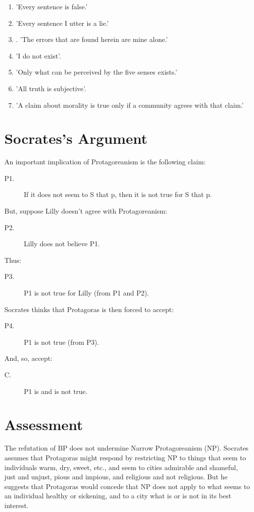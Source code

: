 \documentclass[oneside]{article}
\begin{document}
\begin{enumerate}
\item  'Every sentence is false.' 
\item 'Every sentence I utter is a lie.'
\item. 'The errors that are found herein are mine alone.'
\item 'I do not exist'.
\item 'Only what can be perceived by the five senses exists.'
\item 'All truth is subjective'.
\item 'A claim about morality is true only if a community agrees with that claim.'
\end{enumerate}

\section*{Socrates's Argument}

An important implication of Protagoreanism is the following claim:
\begin{description}
\item[P1.] If it does not seem to S that p, then it is not true for S that p. \end{description}

But, suppose Lilly doesn't agree with Protagoreanism:

\begin{description}
\item[P2.] Lilly does not believe P1. \end{description}
Thus:
\begin{description}
\item[P3.] P1 is not true for Lilly (from P1 and P2).
\end{description}
Socrates thinks that Protagoras is then forced to accept: 
\begin{description}
\item[P4.] P1 is not true (from P3).
\end{description}
And, so, accept: 
\begin{description}
\item[C.] P1 is and is not true. 
\end{description}


\section*{Assessment}

The refutation of BP does not undermine Narrow Protagoreanism (NP). Socrates assumes that Protagoras might respond by restricting NP to things that seem to individuals warm, dry, sweet, etc., and seem to cities admirable and shameful, just and unjust, pious and impious, and religious and not religious. But he suggests that Protagoras would concede that NP does not apply to what seems to an individual healthy or sickening, and to a city what is or is not in its best interest. 
\end{document}
